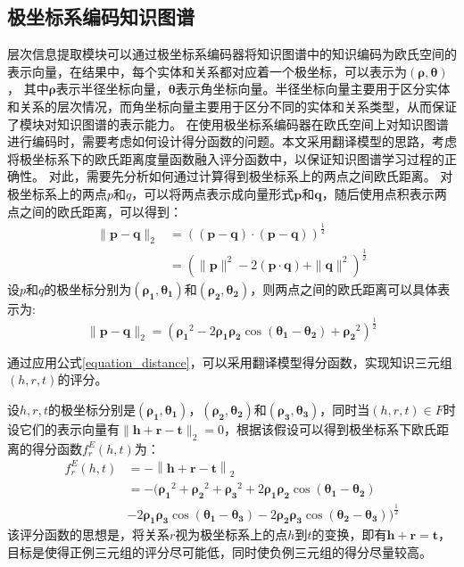 \documentclass[algorithmlist, AutoFakeBold, AutoFakeSlant, figurelist, tablelist, nomlist, engineering]{seuthesix}
\begin{document}
\subsection{极坐标系编码知识图谱}
层次信息提取模块可以通过极坐标系编码器将知识图谱中的知识编码为欧氏空间的表示向量，在结果中，每个实体和关系都对应着一个极坐标，可以表示为$(\bm{\rho}, \bm{\theta})$， 其中$\bm{\rho}$表示半径坐标向量，$\bm{\theta}$表示角坐标向量。半径坐标向量主要用于区分实体和关系的层次情况，而角坐标向量主要用于区分不同的实体和关系类型，从而保证了模块对知识图谱的表示能力。
在使用极坐标系编码器在欧氏空间上对知识图谱进行编码时，需要考虑如何设计得分函数的问题。本文采用翻译模型的思路，考虑将极坐标系下的欧氏距离度量函数融入评分函数中，以保证知识图谱学习过程的正确性。
对此，需要先分析如何通过计算得到极坐标系上的两点之间欧氏距离。
对极坐标系上的两点$p$和$q$，可以将两点表示成向量形式$\bm{p}$和$\bm{q}$，随后使用点积表示两点之间的欧氏距离，可以得到：
\begin{equation}
  \begin{aligned}
  \|\bm{p}-\bm{q}\|_2 & =\left((\bm{p}-\bm{q}) \cdot(\bm{p}-\bm{q})\right)^{\frac{1}{2}} \\
  & =\left(\|\bm{p}\|^2-2(\bm{p} \cdot \bm{q})+\|\bm{q}\|^2\right)^{\frac{1}{2}}
  \end{aligned}
\end{equation}
设$p$和$q$的极坐标分别为$(\bm{\rho_1}, \bm{\theta_1})$和$(\bm{\rho_2}, \bm{\theta_2})$，则两点之间的欧氏距离可以具体表示为:
\begin{equation}
  \|\bm{p}-\bm{q}\|_2=\left(\bm{\rho_1}^2-2 \bm{\rho_1} \bm{\rho_2} \cos \left(\bm{\theta_1}-\bm{\theta_2}\right)+\bm{\rho_2}^2\right)^{\frac{1}{2}}
  \label{equation_distance}
\end{equation}

通过应用公式\ref{equation_distance}，可以采用翻译模型得分函数，实现知识三元组$(h, r, t)$的评分。

设$h, r, t$的极坐标分别是$\left(\bm{\rho_1}, \bm{\theta_1}\right)$，$\left(\bm{\rho_2}, \bm{\theta_2}\right)$和$\left(\bm{\rho_3}, \bm{\theta_3}\right)$，同时当$(h, r, t) \in F$时设它们的表示向量有$\|\bm{h} + \bm{r} - \bm{t}\|_2 = 0$，根据该假设可以得到极坐标系下欧氏距离的得分函数$f^E_r(h, t)$为：
\begin{equation}
  \begin{aligned}
    f^{E}_{r}\left(h, t\right) & =-\left\|\bm{h}+\bm{r}-\bm{t}\right\|_2 \\
    & =-(\bm{\rho_1}^2+\bm{\rho_2}^2+\bm{\rho_3}^2 + 2 \bm{\rho_1} \bm{\rho_2} \cos \left(\bm{\theta_1}-\bm{\theta_2}\right) \\
    & - 2 \bm{\rho_1} \bm{\rho_3} \cos \left(\bm{\theta_1}-\bm{\theta_3}\right) - 2 \bm{\rho_2} \bm{\rho_3} \cos \left(\bm{\theta_2}-\bm{\theta_3}\right))^{\frac{1}{2}}
  \end{aligned}
\end{equation}
该评分函数的思想是，将关系$r$视为极坐标系上的点$h$到$t$的变换，即有$\bm{h} + \bm{r} = \bm{t}$，目标是使得正例三元组的评分尽可能低，同时使负例三元组的得分尽量较高。
\end{document}
